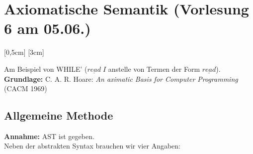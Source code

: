 \section{Axiomatische Semantik \tiny (Vorlesung 6 am 05.06.)}
[0,5cm]
[3cm]

Am Beispiel von WHILE' ($\underline{read}\;I$ anstelle von Termen der Form $\underline{read}$).\\
\textbf{Grundlage:} C. A. R. Hoare: \emph{An aximatic Basis for Computer Programming} (CACM 1969)
\subsection{Allgemeine Methode}
\textbf{Annahme:} AST ist gegeben.\\
Neben der abstrakten Syntax brauchen wir vier Angaben:
